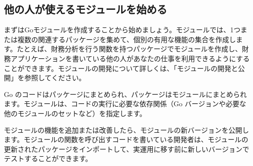 \subsection{他の人が使えるモジュールを始める}

まずはGoモジュールを作成することから始めましょう。モジュールでは、1つまたは複数の関連するパッケージを集めて、個別の有用な機能の集合を作成します。たとえば、財務分析を行う関数を持つパッケージでモジュールを作成し、財務アプリケーションを書いている他の人があなたの仕事を利用できるようにすることができます。モジュールの開発について詳しくは、「モジュールの開発と公開」を参照してください。

Go のコードはパッケージにまとめられ、パッケージはモジュールにまとめられます。モジュールは、コードの実行に必要な依存関係（Go バージョンや必要な他のモジュールのセットなど）を指定します。

モジュールの機能を追加または改善したら、モジュールの新バージョンを公開します。モジュールの関数を呼び出すコードを書いている開発者は、モジュールの更新されたパッケージをインポートして、実運用に移す前に新しいバージョンでテストすることができます。


